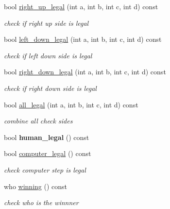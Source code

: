 \begin{DoxyCompactItemize}
bool \hyperlink{classmain__savitch__14_1_1Othello_ab7af6485f5dc762e92f0858c193e088b}{right\+\_\+up\+\_\+legal} (int a, int b, int c, int d) const 
\begin{DoxyCompactList}\small\item\em check if right up side is legal \end{DoxyCompactList}\item 
bool \hyperlink{classmain__savitch__14_1_1Othello_a161a5b2a574446e9cf16e66fab96234d}{left\+\_\+down\+\_\+legal} (int a, int b, int c, int d) const 
\begin{DoxyCompactList}\small\item\em check if left down side is legal \end{DoxyCompactList}\item 
bool \hyperlink{classmain__savitch__14_1_1Othello_a639b1780203d650877491fd69e63871a}{right\+\_\+down\+\_\+legal} (int a, int b, int c, int d) const 
\begin{DoxyCompactList}\small\item\em check if right down side is legal \end{DoxyCompactList}\item 
bool \hyperlink{classmain__savitch__14_1_1Othello_a015372a23879814a43aed9b4259f9834}{all\+\_\+legal} (int a, int b, int c, int d) const 
\begin{DoxyCompactList}\small\item\em combine all check sides \end{DoxyCompactList}\item 
bool {\bfseries human\+\_\+legal} () const \hypertarget{classmain__savitch__14_1_1Othello_ac1a0125fe3994e4c2d24b1440e775da7}{}\label{classmain__savitch__14_1_1Othello_ac1a0125fe3994e4c2d24b1440e775da7}

\item 
bool \hyperlink{classmain__savitch__14_1_1Othello_aa0a3222b954bf36dec6de48bdf17ebb7}{computer\+\_\+legal} () const 
\begin{DoxyCompactList}\small\item\em check computer step is legal \end{DoxyCompactList}\item 
who \hyperlink{classmain__savitch__14_1_1Othello_a8934d1b63f73c03dae9629dbe03955d7}{winning} () const 
\begin{DoxyCompactList}\small\item\em check who is the winnner \end{DoxyCompactList}\end{DoxyCompactItemize}

